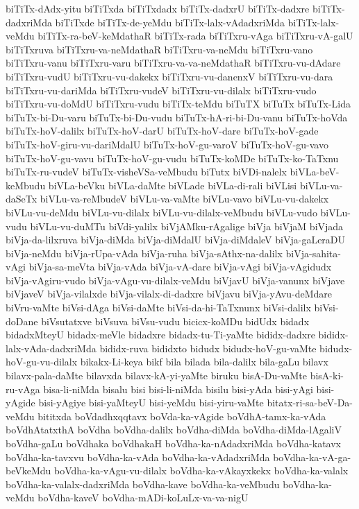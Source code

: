 {biTiTx-dAdx-yitu
biTiTxda
biTiTxdadx
biTiTx-dadxrU
biTiTx-dadxre
biTiTx-dadxriMda
biTiTxde
biTiTx-de-yeMdu
biTiTx-lalx-vAdadxriMda
biTiTx-lalx-veMdu
biTiTx-ra-beV-keMdathaR
biTiTx-rada
biTiTxru-vAga
biTiTxru-vA-galU
biTiTxruva
biTiTxru-va-neMdathaR
biTiTxru-va-neMdu
biTiTxru-vano
biTiTxru-vanu
biTiTxru-varu
biTiTxru-va-va-neMdathaR
biTiTxru-vu-dAdare
biTiTxru-vudU
biTiTxru-vu-dakekx
biTiTxru-vu-danenxV
biTiTxru-vu-dara
biTiTxru-vu-dariMda
biTiTxru-vudeV
biTiTxru-vu-dilalx
biTiTxru-vudo
biTiTxru-vu-doMdU
biTiTxru-vudu
biTiTx-teMdu
biTuTX
biTuTx
biTuTx-Lida
biTuTx-bi-Du-varu
biTuTx-bi-Du-vudu
biTuTx-hA-ri-bi-Du-vanu
biTuTx-hoVda
biTuTx-hoV-dalilx
biTuTx-hoV-darU
biTuTx-hoV-dare
biTuTx-hoV-gade
biTuTx-hoV-giru-vu-dariMdalU
biTuTx-hoV-gu-varoV
biTuTx-hoV-gu-vavo
biTuTx-hoV-gu-vavu
biTuTx-hoV-gu-vudu
biTuTx-koMDe
biTuTx-ko-TaTxnu
biTuTx-ru-vudeV
biTuTx-visheVSa-veMbudu
biTutx
biVDi-nalelx
biVLa-beV-keMbudu
biVLa-beVku
biVLa-daMte
biVLade
biVLa-di-rali
biVLisi
biVLu-va-daSeTx
biVLu-va-reMbudeV
biVLu-va-vaMte
biVLu-vavo
biVLu-vu-dakekx
biVLu-vu-deMdu
biVLu-vu-dilalx
biVLu-vu-dilalx-veMbudu
biVLu-vudo
biVLu-vudu
biVLu-vu-duMTu
biVdi-yalilx
biVjAMku-rAgalige
biVja
biVjaM
biVjada
biVja-da-lilxruva
biVja-diMda
biVja-diMdalU
biVja-diMdaleV
biVja-gaLeraDU
biVja-neMdu
biVja-rUpa-vAda
biVja-ruha
biVja-sAthx-na-dalilx
biVja-sahita-vAgi
biVja-sa-meVta
biVja-vAda
biVja-vA-dare
biVja-vAgi
biVja-vAgidudx
biVja-vAgiru-vudo
biVja-vAgu-vu-dilalx-veMdu
biVjavU
biVja-vanunx
biVjave
biVjaveV
biVja-vilalxde
biVja-vilalx-di-dadxre
biVjavu
biVja-yAvu-deMdare
biVru-vaMte
biVsi-dAga
biVsi-daMte
biVsi-da-hi-TaTxnunx
biVsi-dalilx
biVsi-doDane
biVsutatxve
biVsuva
biVsu-vudu
bicicx-koMDu
bidUdx
bidadx
bidadxMteyU
bidadx-meVle
bidadxre
bidadx-tu-Ti-yaMte
bididx-dadxre
bididx-lalx-vAda-dadxriMda
bididx-ruva
bididxto
bidudx
bidudx-hoV-gu-vaMte
bidudx-hoV-gu-vu-dilalx
bikakx-Li-keya
bikf
bila
bilada
bila-dalilx
bila-gaLu
bilavx
bilavx-pala-daMte
bilavxda
bilavx-kA-yi-yaMte
biruku
bisA-Du-vaMte
bisA-ki-ru-vAga
bisa-li-niMda
bisalu
bisi
bisi-li-niMda
bisilu
bisi-yAda
bisi-yAgi
bisi-yAgide
bisi-yAgiye
bisi-yaMteyU
bisi-yeMdu
bisi-yiru-vaMte
bitatx-ri-sa-beV-Da-veMdu
bititxda
boVdadhxqqtavx
boVda-ka-vAgide
boVdhA-tamx-ka-vAda
boVdhAtatxthA
boVdha
boVdha-dalilx
boVdha-diMda
boVdha-diMda-lAgaliV
boVdha-gaLu
boVdhaka
boVdhakaH
boVdha-ka-nAdadxriMda
boVdha-katavx
boVdha-ka-tavxvu
boVdha-ka-vAda
boVdha-ka-vAdadxriMda
boVdha-ka-vA-ga-beVkeMdu
boVdha-ka-vAgu-vu-dilalx
boVdha-ka-vAkayxkekx
boVdha-ka-valalx
boVdha-ka-valalx-dadxriMda
boVdha-kave
boVdha-ka-veMbudu
boVdha-ka-veMdu
boVdha-kaveV
boVdha-mADi-koLuLx-va-va-nigU
}
